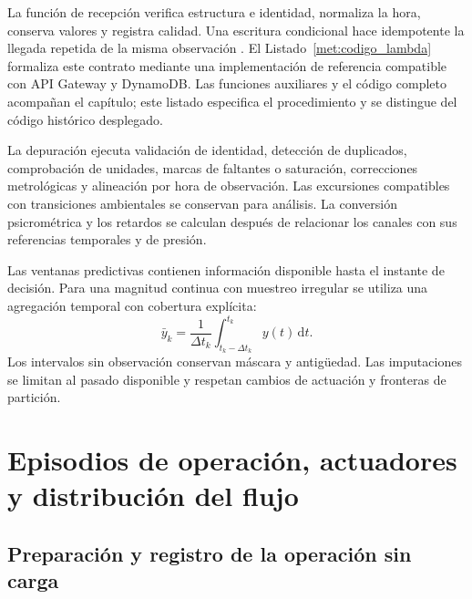 La función de recepción verifica estructura e identidad, normaliza la hora, conserva valores y registra calidad. Una escritura condicional hace idempotente la llegada repetida de la misma observación \cite{aws_lambda_proxy,aws_dynamodb_putitem}. El Listado~\ref{met:codigo_lambda} formaliza este contrato mediante una implementación de referencia compatible con API Gateway y DynamoDB. Las funciones auxiliares y el código completo acompañan el capítulo; este listado especifica el procedimiento y se distingue del código histórico desplegado.



La depuración ejecuta validación de identidad, detección de duplicados, comprobación de unidades, marcas de faltantes o saturación, correcciones metrológicas y alineación por hora de observación. Las excursiones compatibles con transiciones ambientales se conservan para análisis. La conversión psicrométrica y los retardos se calculan después de relacionar los canales con sus referencias temporales y de presión.

Las ventanas predictivas contienen información disponible hasta el instante de decisión. Para una magnitud continua con muestreo irregular se utiliza una agregación temporal con cobertura explícita:
\begin{equation}
\bar y_k=\frac{1}{\Delta t_k}\int_{t_k-\Delta t_k}^{t_k}y(t)\,\mathrm dt.
\label{met:agregacion_causal}
\end{equation}
Los intervalos sin observación conservan máscara y antigüedad. Las imputaciones se limitan al pasado disponible y respetan cambios de actuación y fronteras de partición.
\FloatBarrier

\section{Episodios de operación, actuadores y distribución del flujo}
\label{met:campana}

\subsection{Preparación y registro de la operación sin carga}

